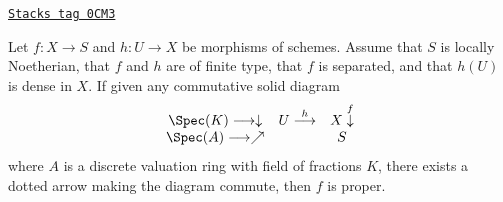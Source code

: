 \begin{lemma}
\label{limits-lemma-refined-valuative-criterion-proper}
\href{https://stacks.math.columbia.edu/tag/0CM3}{\texttt{Stacks tag 0CM3}}

Let $f : X \to S$ and $h : U \to X$ be morphisms of schemes.
Assume that $S$ is locally Noetherian, that $f$ and $h$ are of finite type,
that $f$ is separated, and that $h(U)$ is dense in $X$.
If given any commutative solid diagram
$$
\begin{array}{ccc}\Spec(K) \longrightarrow\downarrow & U \overset{h}{\longrightarrow} & X \overset{f}{\downarrow} \\ \Spec(A) \longrightarrow\nearrow &  & S\end{array}
$$
where $A$ is a discrete valuation ring with field of fractions $K$, there
exists a dotted arrow making the diagram commute, then $f$ is proper.
\end{lemma}

